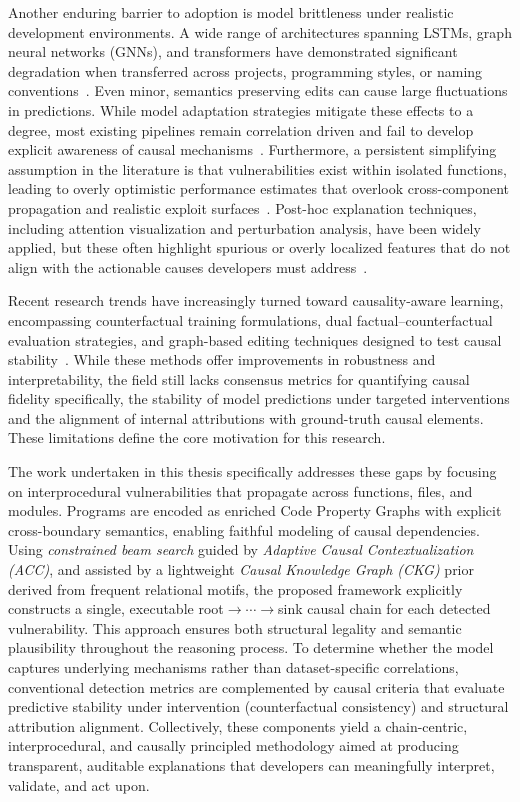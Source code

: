 \documentclass{buthesis}
\begin{document}
Another enduring barrier to adoption is model brittleness under realistic development environments. A wide range of architectures spanning LSTMs, graph neural networks (GNNs), and transformers have demonstrated significant degradation when transferred across projects, programming styles, or naming conventions~\cite{Li2022Empirical}. Even minor, semantics preserving edits can cause large fluctuations in predictions. While model adaptation strategies mitigate these effects to a degree, most existing pipelines remain correlation driven and fail to develop explicit awareness of causal mechanisms~\cite{Zou2020}. Furthermore, a persistent simplifying assumption in the literature is that vulnerabilities exist within isolated functions, leading to overly optimistic performance estimates that overlook cross-component propagation and realistic exploit surfaces~\cite{Le2024MBU}. Post-hoc explanation techniques, including attention visualization and perturbation analysis, have been widely applied, but these often highlight spurious or overly localized features that do not align with the actionable causes developers must address~\cite{Allix2024,Moschitti2024}.

Recent research trends have increasingly turned toward causality-aware learning, encompassing counterfactual training formulations, dual factual–counterfactual evaluation strategies, and graph-based editing techniques designed to test causal stability~\cite{Cao2024ICSE,Chu2024ISSTA,Rahman2024ICSE,Kuang2024KSEM,Cao2024ASE}. While these methods offer improvements in robustness and interpretability, the field still lacks consensus metrics for quantifying causal fidelity specifically, the stability of model predictions under targeted interventions and the alignment of internal attributions with ground-truth causal elements. These limitations define the core motivation for this research.

The work undertaken in this thesis specifically addresses these gaps by focusing on interprocedural vulnerabilities that propagate across functions, files, and modules. Programs are encoded as enriched Code Property Graphs with explicit cross-boundary semantics, enabling faithful modeling of causal dependencies. Using \emph{constrained beam search} guided by \emph{Adaptive Causal Contextualization (ACC)}, and assisted by a lightweight \emph{Causal Knowledge Graph (CKG)} prior derived from frequent relational motifs, the proposed framework explicitly constructs a single, executable root$\rightarrow\cdots\rightarrow$sink causal chain for each detected vulnerability. This approach ensures both structural legality and semantic plausibility throughout the reasoning process. To determine whether the model captures underlying mechanisms rather than dataset-specific correlations, conventional detection metrics are complemented by causal criteria that evaluate predictive stability under intervention (counterfactual consistency) and structural attribution alignment. Collectively, these components yield a chain-centric, interprocedural, and causally principled methodology aimed at producing transparent, auditable explanations that developers can meaningfully interpret, validate, and act upon.
\end{document}
